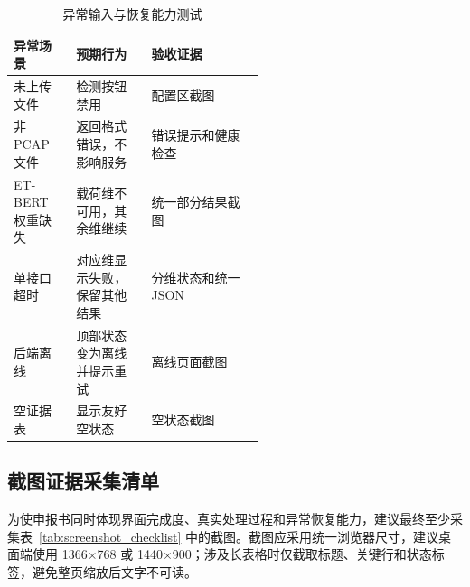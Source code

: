 \begin{table}[H]
\centering
\caption{异常输入与恢复能力测试}
\label{tab:recovery_test}
\small
\begin{tabularx}{\linewidth}{p{0.25\linewidth}p{0.30\linewidth}X}
\toprule
\textbf{异常场景} & \textbf{预期行为} & \textbf{验收证据} \\
\midrule
未上传文件 & 检测按钮禁用 & 配置区截图 \\
非 PCAP 文件 & 返回格式错误，不影响服务 & 错误提示和健康检查 \\
ET-BERT 权重缺失 & 载荷维不可用，其余维继续 & 统一部分结果截图 \\
单接口超时 & 对应维显示失败，保留其他结果 & 分维状态和统一 JSON \\
后端离线 & 顶部状态变为离线并提示重试 & 离线页面截图 \\
空证据表 & 显示友好空状态 & 空状态截图 \\
\bottomrule
\end{tabularx}
\end{table}

\subsection{截图证据采集清单}
\label{subsec:screenshot_checklist}

为使申报书同时体现界面完成度、真实处理过程和异常恢复能力，建议最终至少采集表~\ref{tab:screenshot_checklist} 中的截图。截图应采用统一浏览器尺寸，建议桌面端使用 1366$\times$768 或 1440$\times$900；涉及长表格时仅截取标题、关键行和状态标签，避免整页缩放后文字不可读。

